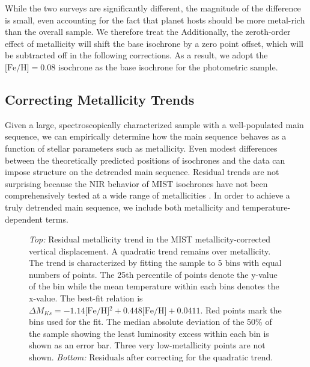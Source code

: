 \documentclass[twocolumn]{aastex6}
\newcommand{\MK}{\ensuremath{M_{Ks}}}
\newcommand{\feh}{\textrm{[Fe/H]}}
\begin{document}
While the two surveys are significantly different, the magnitude of the
difference is small, even accounting for the fact that planet hosts should be
more metal-rich than the overall sample. We therefore treat the
Additionally, the zeroth-order effect of metallicity will shift the base 
isochrone by a zero point offset, which will be subtracted off in the 
following corrections. As a result, we adopt the \(\feh{} = 0.08\) isochrone as 
the base isochrone for the photometric sample. 


\subsection{Correcting Metallicity Trends}
\label{sec:speccor}

Given a large, spectroscopically characterized sample with a well-populated 
main sequence, we can empirically determine how the main sequence behaves as a
function of stellar parameters such as metallicity.  Even modest differences 
between the theoretically predicted positions of isochrones and the data can 
impose structure on the detrended main sequence. Residual trends are not 
surprising because the NIR behavior of MIST isochrones have not been 
comprehensively tested at a wide range of metallicities \citep{Choi16}.  In 
order to achieve a truly detrended main sequence, we include both metallicity 
and temperature-dependent terms.

\begin{figure}[htb]
    \centering
    \caption{\emph{Top:} Residual metallicity trend in the MIST 
        metallicity-corrected vertical displacement. A quadratic trend remains over 
        metallicity. The trend is characterized by fitting the sample to 
        5 bins with equal numbers of points.  The 25th percentile of points 
        denote the y-value of the bin while the mean temperature within each
        bins denotes the x-value. The best-fit relation is \(\Delta
            \MK{} = -1.14\feh{}^2 + 0.448 \feh{} + 0.0411\). Red points mark 
            the bins used for the fit.  The median absolute deviation of the 
            50\% of the sample showing the
        least luminosity excess within each bin is shown as an error bar. Three 
        very low-metallicity points are not shown.  \emph{Bottom:} Residuals 
        after correcting for the quadratic trend.}\label{fig:met_trend}
\end{figure}
\end{document}
